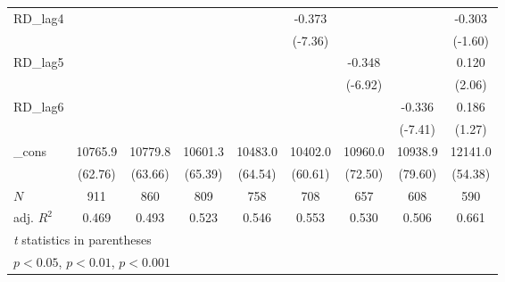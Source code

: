 {\begin{tabular}{l*{8}{c}}
RD\_lag4     &                     &                     &                     &                     &      -0.373\sym{***}&                     &                     &      -0.303         \\
            &                     &                     &                     &                     &     (-7.36)         &                     &                     &     (-1.60)         \\
\addlinespace
RD\_lag5     &                     &                     &                     &                     &                     &      -0.348\sym{***}&                     &       0.120\sym{*}  \\
            &                     &                     &                     &                     &                     &     (-6.92)         &                     &      (2.06)         \\
\addlinespace
RD\_lag6     &                     &                     &                     &                     &                     &                     &      -0.336\sym{***}&       0.186         \\
            &                     &                     &                     &                     &                     &                     &     (-7.41)         &      (1.27)         \\
\addlinespace
\_cons      &     10765.9\sym{***}&     10779.8\sym{***}&     10601.3\sym{***}&     10483.0\sym{***}&     10402.0\sym{***}&     10960.0\sym{***}&     10938.9\sym{***}&     12141.0\sym{***}\\
            &     (62.76)         &     (63.66)         &     (65.39)         &     (64.54)         &     (60.61)         &     (72.50)         &     (79.60)         &     (54.38)         \\
\midrule
\(N\)       &         911         &         860         &         809         &         758         &         708         &         657         &         608         &         590         \\
adj. \(R^{2}\)&       0.469         &       0.493         &       0.523         &       0.546         &       0.553         &       0.530         &       0.506         &       0.661         \\
\bottomrule
\multicolumn{9}{l}{\footnotesize \textit{t} statistics in parentheses}\\
\multicolumn{9}{l}{\footnotesize \sym{*} \(p<0.05\), \sym{**} \(p<0.01\), \sym{***} \(p<0.001\)}\\
\end{tabular}
}
